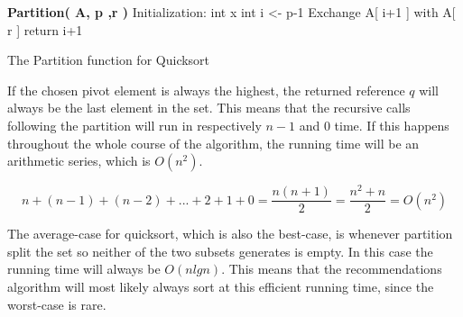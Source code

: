 \begin{algorithm}
	\DontPrintSemicolon
	\textbf{Partition( A, p ,r )}\;
	Initialization:\;
	int x\;
	int i <- p-1\;
	Exchange A[ i+1 ] with A[ r ]\;
	return i+1\;
	\caption{The Partition function for Quicksort}
	\label{Partition}
\end{algorithm}

If the chosen pivot element is always the highest, the returned reference $q$ will always be the last element in the set. This means that the recursive calls following the partition will run in respectively $n-1$ and $0$ time. If this happens throughout the whole course of the algorithm, the running time will be an arithmetic series\cite{AlgoAnal2},  which is $O(n^2)$.

\[
n + (n-1) + (n-2) + ... + 2 + 1 + 0 = \frac{n(n + 1)}{2}  = \frac{n^2 + n}{2} = O(n^2)
\]

The average-case for quicksort, which is also the best-case, is whenever partition split the set so neither of the two subsets generates is empty. In this case the running time will always be $O(nlgn)$. This means that the recommendations algorithm will most likely always sort at this efficient running time, since the worst-case is rare.